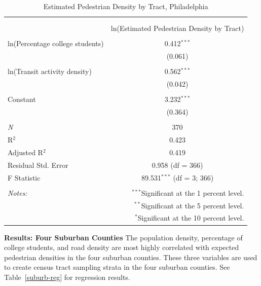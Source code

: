 \documentclass[paper=letterpaper, fontsize=11pt]{scrartcl}
\begin{document}
\begin{table}[!htbp] \centering 
	\caption{Estimated Pedestrian Density by Tract, Philadelphia} 
	\label{phila-reg} 
	\begin{tabular}{@{\extracolsep{5pt}}lc} 
		\\[-1.8ex]\hline 
		\hline \\[-1.8ex] 
		\\[-1.8ex] & ln(Estimated Pedestrian Density by Tract) \\ 
		\hline \\[-1.8ex] 
		ln(Percentage college students) & 0.412$^{***}$ \\ 
		& (0.061) \\ 
		& \\ 
		ln(Transit activity density) & 0.562$^{***}$ \\ 
		& (0.042) \\ 
		& \\ 
		Constant & 3.232$^{***}$ \\ 
		& (0.364) \\ 
		& \\ 
		\textit{N} & 370 \\ 
		R$^{2}$ & 0.423 \\ 
		Adjusted R$^{2}$ & 0.419 \\ 
		Residual Std. Error & 0.958 (df = 366) \\ 
		F Statistic & 89.531$^{***}$ (df = 3; 366) \\ 
		\hline 
		\hline \\[-1.8ex] 
		\textit{Notes:} & \multicolumn{1}{r}{$^{***}$Significant at the 1 percent level.} \\ 
		& \multicolumn{1}{r}{$^{**}$Significant at the 5 percent level.} \\ 
		& \multicolumn{1}{r}{$^{*}$Significant at the 10 percent level.} \\ 
	\end{tabular} 
\end{table} 

\textbf{Results: Four Suburban Counties}
The population density, percentage of college students, and road density are most highly correlated with expected pedestrian densities in the four suburban counties. These three variables are used to create census tract sampling strata in the four suburban counties. See Table~\ref{suburb-reg} for regression results.
\end{document}
